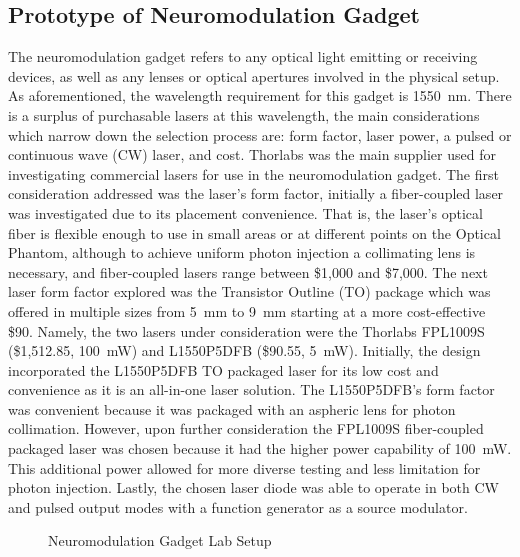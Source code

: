 \documentclass[journal,twoside,web]{ieeecolor}
\begin{document}
\subsection{Prototype of Neuromodulation Gadget}
The neuromodulation gadget refers to any optical light emitting or receiving devices, as well as any lenses or optical apertures involved in the physical setup. 
As aforementioned, the wavelength requirement for this gadget is 1550~nm. There is a surplus of purchasable lasers at this wavelength, the main considerations 
which narrow down the selection process are: form factor, laser power, a pulsed or continuous wave (CW) laser, and cost. Thorlabs was the main supplier used for 
investigating commercial lasers for use in the neuromodulation gadget. The first consideration addressed was the laser's form factor, initially a fiber-coupled laser 
was investigated due to its placement convenience. That is, the laser's optical fiber is flexible enough to use in small areas or at different points on the Optical Phantom, although to achieve 
uniform photon injection a collimating lens is necessary, and fiber-coupled lasers range between \$1,000 and \$7,000. The next laser form factor explored was the Transistor Outline (TO) 
package which was offered in multiple sizes from \SI{5}{\milli\meter} to \SI{9}{\milli\meter} starting at a more cost-effective \$90. Namely, the two lasers under consideration were the 
Thorlabs FPL1009S (\$1,512.85, \SI{100}{\milli\watt}) and L1550P5DFB (\$90.55, \SI{5}{\milli\watt}). Initially, the design incorporated the L1550P5DFB TO packaged laser for its low cost 
and convenience as it is an all-in-one laser solution. The L1550P5DFB's form factor was convenient because it was packaged with an aspheric lens for photon collimation. 
However, upon further consideration the FPL1009S fiber-coupled packaged laser was chosen because it had the higher power capability of \SI{100}{\milli\watt}. This additional power allowed for 
more diverse testing and less limitation for photon injection. Lastly, the chosen laser diode was able to operate in both CW and pulsed output modes with a function generator as a source modulator.

\begin{figure}[hbt]
    \caption{\label{fig:LaserSetup} Neuromodulation Gadget Lab Setup}
\end{figure}
\end{document}
